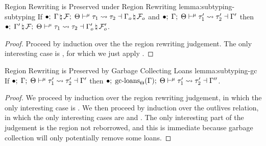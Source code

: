 \begin{oxlemma}{Region Rewriting is Preserved under Region Rewriting}
  {lemma:subtyping-subtyping} If
  $\bullet; \; \Gamma \, \natural \, \mathcal{F}; \; \Theta \vdash^{\mu} \tau_1 \leadsto \tau_2 \dashv \Gamma_o \, \natural \, \mathcal{F}_o$ and
  $\bullet; \; \Gamma; \; \Theta \vdash^{\mu} \tau_1^\prime \leadsto \tau_2^\prime \dashv \Gamma^\prime$ then
  $\bullet; \; \Gamma^\prime \, \natural \, \mathcal{F}; \; \Theta \vdash^{\mu} \tau_1 \leadsto \tau_2 \dashv \Gamma_o^\prime \, \natural \, \mathcal{F}_o^\prime$.
\end{oxlemma}
\begin{proof}
  Proceed by induction over the the region rewriting judgement. The only
  interesting case is , for which we just apply
  .
\end{proof}

\begin{oxlemma}{Region Rewriting is Preserved by Garbage Collecting Loans}
  {lemma:subtyping-gc} If
  $\bullet; \; \Gamma; \; \Theta \vdash^{\mu} \tau_1^\prime \leadsto \tau_2^\prime \dashv \Gamma^\prime$
  then
  $\bullet; \; \textrm{gc-loans}_{\Theta}(\Gamma); \; \Theta \vdash^{\mu} \tau_1^\prime \leadsto \tau_2^\prime \dashv \Gamma^{\prime\prime}$.
\end{oxlemma}
\begin{proof}
  We proceed by induction over the region rewriting judgement, in which the only
  interesting case is . We then proceed by induction over
  the outlives relation, in which the only interesting cases are
   and . The only
  interesting part of the judgement is the region not reborrowed, and this is
  immediate because garbage collection will only potentially remove some loans.
\end{proof}

